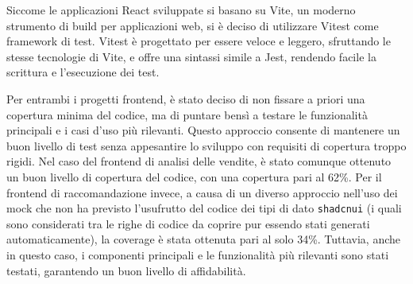 Siccome le applicazioni React sviluppate si basano su Vite, un moderno strumento di build per applicazioni web, si è deciso di utilizzare Vitest come framework di test. Vitest è progettato per essere veloce e leggero, sfruttando le stesse tecnologie di Vite, e offre una sintassi simile a Jest, rendendo facile la scrittura e l'esecuzione dei test.

Per entrambi i progetti frontend, è stato deciso di non fissare a priori una copertura minima del codice, ma di puntare bensì a testare le funzionalità principali e i casi d'uso più rilevanti. Questo approccio consente di mantenere un buon livello di test senza appesantire lo sviluppo con requisiti di copertura troppo rigidi.
Nel caso del frontend di analisi delle vendite, è stato comunque ottenuto un buon livello di copertura del codice, con una copertura pari al 62\%. Per il frontend di raccomandazione invece, a causa di un diverso approccio nell'uso dei mock che non ha previsto l'usufrutto del codice dei tipi di dato \texttt{\gls{shadcnui}} (i quali sono considerati tra le righe di codice da coprire pur essendo stati generati automaticamente), la coverage è stata ottenuta pari al solo 34\%. Tuttavia, anche in questo caso, i componenti principali e le funzionalità più rilevanti sono stati testati, garantendo un buon livello di affidabilità.
